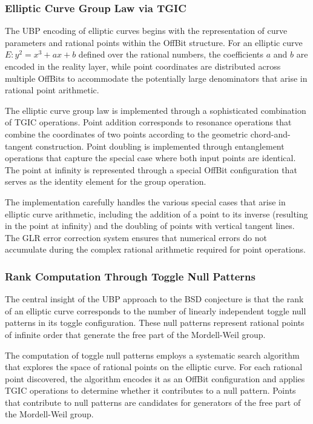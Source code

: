 \documentclass[11pt]{amsart}
\begin{document}
\subsubsection{Elliptic Curve Group Law via TGIC}

The UBP encoding of elliptic curves begins with the representation of curve parameters and rational points within the OffBit structure. For an elliptic curve $E: y^2 = x^3 + ax + b$ defined over the rational numbers, the coefficients $a$ and $b$ are encoded in the reality layer, while point coordinates are distributed across multiple OffBits to accommodate the potentially large denominators that arise in rational point arithmetic.

The elliptic curve group law is implemented through a sophisticated combination of TGIC operations. Point addition corresponds to resonance operations that combine the coordinates of two points according to the geometric chord-and-tangent construction. Point doubling is implemented through entanglement operations that capture the special case where both input points are identical. The point at infinity is represented through a special OffBit configuration that serves as the identity element for the group operation.

The implementation carefully handles the various special cases that arise in elliptic curve arithmetic, including the addition of a point to its inverse (resulting in the point at infinity) and the doubling of points with vertical tangent lines. The GLR error correction system ensures that numerical errors do not accumulate during the complex rational arithmetic required for point operations.

\subsubsection{Rank Computation Through Toggle Null Patterns}

The central insight of the UBP approach to the BSD conjecture is that the rank of an elliptic curve corresponds to the number of linearly independent toggle null patterns in its toggle configuration. These null patterns represent rational points of infinite order that generate the free part of the Mordell-Weil group.

The computation of toggle null patterns employs a systematic search algorithm that explores the space of rational points on the elliptic curve. For each rational point discovered, the algorithm encodes it as an OffBit configuration and applies TGIC operations to determine whether it contributes to a null pattern. Points that contribute to null patterns are candidates for generators of the free part of the Mordell-Weil group.
\end{document}
